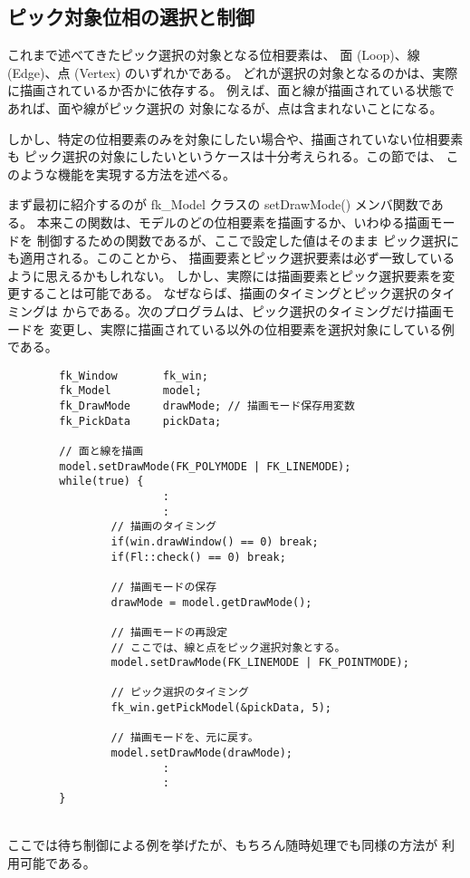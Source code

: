 \subsection{ピック対象位相の選択と制御} \label{subsec:picktype}
これまで述べてきたピック選択の対象となる位相要素は、
面 (Loop)、線 (Edge)、点 (Vertex) のいずれかである。
どれが選択の対象となるのかは、実際に描画されているか否かに依存する。
例えば、面と線が描画されている状態であれば、面や線がピック選択の
対象になるが、点は含まれないことになる。

しかし、特定の位相要素のみを対象にしたい場合や、描画されていない位相要素も
ピック選択の対象にしたいというケースは十分考えられる。この節では、
このような機能を実現する方法を述べる。

まず最初に紹介するのが fk\_Model クラスの setDrawMode() メンバ関数である。
本来この関数は、モデルのどの位相要素を描画するか、いわゆる描画モードを
制御するための関数であるが、ここで設定した値はそのまま
ピック選択にも適用される。このことから、
描画要素とピック選択要素は必ず一致しているように思えるかもしれない。
しかし、実際には描画要素とピック選択要素を変更することは可能である。
なぜならば、描画のタイミングとピック選択のタイミングは
からである。次のプログラムは、ピック選択のタイミングだけ描画モードを
変更し、実際に描画されている以外の位相要素を選択対象にしている例である。
\\
\begin{breakbox}
\begin{verbatim}
        fk_Window       fk_win;
        fk_Model        model;
        fk_DrawMode     drawMode; // 描画モード保存用変数
        fk_PickData     pickData;

        // 面と線を描画
        model.setDrawMode(FK_POLYMODE | FK_LINEMODE);
        while(true) {
                        :
                        :
                // 描画のタイミング
                if(win.drawWindow() == 0) break;
                if(Fl::check() == 0) break;

                // 描画モードの保存
                drawMode = model.getDrawMode();

                // 描画モードの再設定
                // ここでは、線と点をピック選択対象とする。
                model.setDrawMode(FK_LINEMODE | FK_POINTMODE);

                // ピック選択のタイミング
                fk_win.getPickModel(&pickData, 5);

                // 描画モードを、元に戻す。
                model.setDrawMode(drawMode);
                        :
                        :
        }
\end{verbatim}
\end{breakbox}
~ \\
ここでは待ち制御による例を挙げたが、もちろん随時処理でも同様の方法が
利用可能である。

